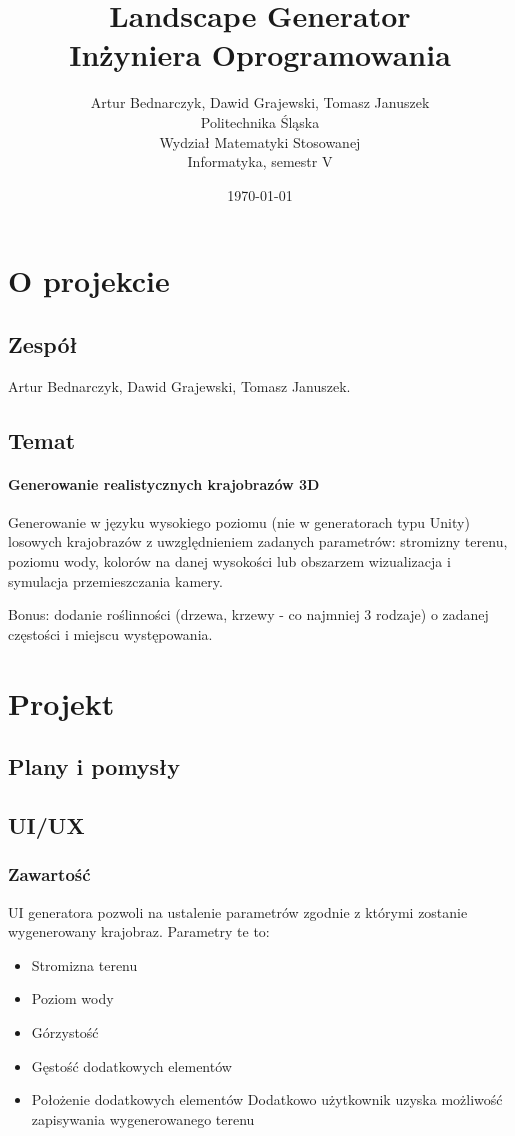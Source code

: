 \documentclass[12pt,a4paper]{article}
\title{Landscape Generator\\Inżyniera Oprogramowania}
\author{Artur Bednarczyk, Dawid Grajewski, Tomasz Januszek\\Politechnika Śląska\\Wydział Matematyki Stosowanej\\Informatyka, semestr V}
\date{\today}
\begin{document}
\maketitle
\newpage
\tableofcontents
\newpage
\section{O projekcie}
\subsection{Zespół}
Artur Bednarczyk, Dawid Grajewski, Tomasz Januszek.
\subsection{Temat}
\paragraph{Generowanie realistycznych krajobrazów 3D}
Generowanie w języku wysokiego poziomu (nie w generatorach typu Unity) losowych krajobrazów z uwzględnieniem zadanych parametrów: stromizny terenu, poziomu wody, kolorów na danej wysokości lub obszarzem wizualizacja i symulacja przemieszczania kamery.

Bonus: dodanie roślinności (drzewa, krzewy - co najmniej 3 rodzaje) o zadanej częstości i miejscu występowania.

\section{Projekt}
\subsection{Plany i pomysły}

\subsection{UI/UX}
\subsubsection{Zawartość}
UI generatora pozwoli na ustalenie parametrów zgodnie z którymi zostanie wygenerowany krajobraz. Parametry te to: \begin{itemize}
\item Stromizna terenu
\item Poziom wody
\item Górzystość
\item Gęstość dodatkowych elementów
\item Położenie dodatkowych elementów
Dodatkowo użytkownik uzyska możliwość zapisywania wygenerowanego terenu 
\end{itemize}
\end{document}
